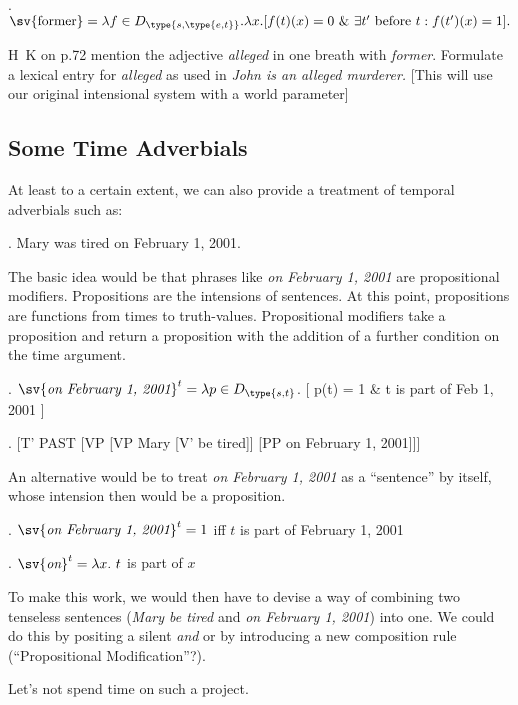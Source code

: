 \ex. $\sv{\mbox{former}} = \lambda f \in D_{\type{s,\type{e,t}}}. \lambda x. [f(t)(x)=0\ \&\ \exists t' \mbox{ before } t: f(t')(x) = 1].$

\begin{exercise}

H\amp\ K on p.72 mention the adjective \emph{alleged} in one breath with \emph{former}. Formulate a lexical entry for \emph{alleged} as used in \emph{John is an alleged murderer.} [This will use our original intensional system with a world parameter] \eex
\end{exercise}

\subsection{Some Time Adverbials}

At least to a certain extent, we can also provide a treatment of temporal adverbials such as:

\ex. Mary was tired on February 1, 2001.

The basic idea would be that phrases like \emph{on February 1, 2001} are propositional modifiers. Propositions are the intensions of sentences. At this point, propositions are functions from times to truth-values. Propositional modifiers take a proposition and return a proposition with the addition of a further condition on the time argument.

\ex. $\sv{\emph{on February 1, 2001}}^{t} \\ = \ensuremath{\lambda}p\ensuremath{\in}D_{\type{s,t}}$. 
[ p(t) = 1 \& t is part of Feb 1, 2001 ]

\exi.  \label{lfpp1}[T' PAST [VP [VP Mary [V' be tired]] [PP on February 1, 2001]]]

An alternative would be to treat \emph{on February 1, 2001} as a ``sentence'' by itself, whose intension then would be a proposition.

\ex. $\sv{\emph{on February 1, 2001}}^{t} = 1$ iff $t$ is part of February 1, 2001

\ex. $\sv{\emph{on}}^{t} = \ensuremath{\lambda}x.\ t$ is part of $x$

To make this work, we would then have to devise a way of combining two tenseless sentences (\emph{Mary be tired} and \emph{on February 1, 2001}) into one. We could do this by positing a silent \emph{and} or by introducing a new composition rule (``Propositional Modification''?).

Let's not spend time on such a project.

